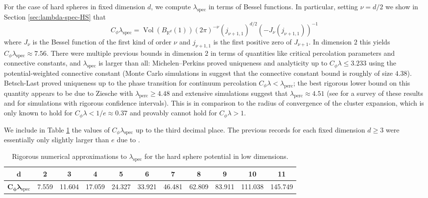 \documentclass[10pt]{amsart}
\theoremstyle{definition}
\theoremstyle{remark}
\newcommand{\spec}{{\mathrm{spec}}}
\newcommand{\Vol}{\operatorname{Vol}}
\newcommand{\R}{\mathbb{R}}
\begin{document}
	
	For the case of hard spheres in fixed dimension $d$, we compute $\lambda_\spec$ in terms of Bessel functions.  In particular, setting $\nu = d/2$ we show in Section \ref{sec:lambda-spec-HS} that 
	\begin{equation*}
		C_\phi \lambda_\spec = \Vol(B_{\R^d}(1)) (2\pi)^{-\nu} ( j_{\nu + 1,1})^{d/2} (-J_{\nu}(j_{\nu + 1,1}))^{-1}
	\end{equation*}
	where $J_\nu$ is the Bessel function of the first kind of order $\nu$ and $j_{\nu+1,1}$ is the first positive zero of $J_{\nu+1}$.  In dimension $2$ this yields $C_\phi \lambda_\spec \approx 7.56$.  There were multiple previous bounds in dimension $2$ in terms of quantities like critical percolation parameters and connective constants, and $\lambda_\spec$ is larger than all: Michelen--Perkins \cite{michelen2025potential} proved uniqueness and analyticity up to $C_\phi \lambda \leq 3.233$ using the potential-weighted connective constant (Monte Carlo simulations in \cite{michelen2025potential} suggest that the connective constant bound is roughly of size $4.38$). Betsch-Last \cite{betsch2023uniqueness} proved uniqueness up to the phase transition for continuum percolation  $C_\phi\lambda < \lambda_{\mathrm{perc}}$; the best rigorous lower bound on this quantity appears to be due to Ziesche \cite{ziesche2018sharpness} with $\lambda_{\mathrm{perc}} \geq 4.48$ and extensive simulations suggest that $\lambda_{\mathrm{perc}} \approx 4.51$ (see \cite{mertens2012continuum} for a survey of these results and \cite{balister2005continuum} for simulations with rigorous confidence intervals).  This is in comparison to the radius of convergence of the cluster expansion, which is only known to hold for $C_\phi \lambda < 1/e \approx 0.37$ and provably cannot hold for $C_\phi \lambda > 1$.
	
	We include in Table \ref{tab:hard-sphere-low-dimensions} the values of $C_\phi \lambda_\spec$ up to the third decimal place.  The previous records for each fixed dimension $d \geq 3$ were essentially only slightly larger than $e$ due to \cite{michelen2025potential}.
	\begin{table}[h!]        
		\centering
		\begin{tabular}{|c||c|c|c|c|c|c|c|c|c|c|}
			\hline
			$\bm{d}$ & 2 & 3 & 4 & 5 & 6 & 7 & 8 & 9 & 10 & 11 \\
			\hline
			$\bm{C_\phi\lambda_{\spec}}$ & 7.559 & 11.604 & 17.059 & 24.327 & 33.921 & 46.481 & 62.809 & 83.911 & 111.038 & 145.749\\
			\hline
		\end{tabular}
		\caption{Rigorous numerical approximations to $\lambda_{\spec}$ for the hard sphere potential in low dimensions.} 
		\label{tab:hard-sphere-low-dimensions}
	\end{table}
	
\end{document}
